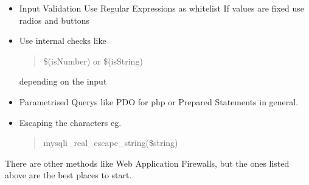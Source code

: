 \begin{itemize}
    \item Input Validation
    \subitem Use Regular Expressions as whitelist
    \subitem If values are fixed use radios and buttons
    \item Use internal checks like \begin{quotation}
        \$(isNumber) or \$(isString)
    \end{quotation} depending on the input
    \item Parametrised Querys like PDO for php or Prepared Statements in general.
    \item Escaping the characters eg. \begin{quote}
        mysqli\_real\_escape\_string(\$string)
    \end{quote}
\end{itemize}
There are other methods like Web Application Firewalls, but the ones listed above are the best places to start.

